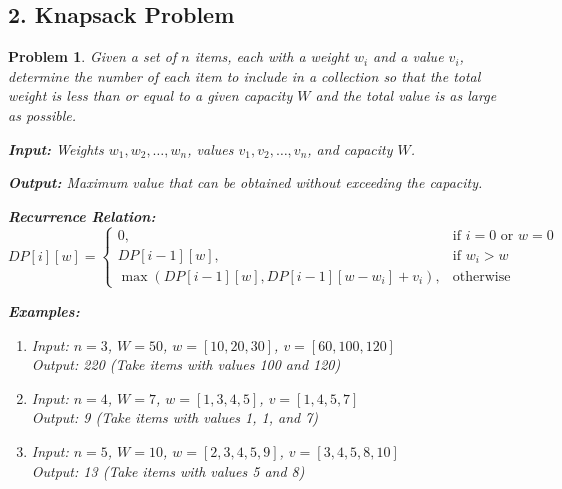 \documentclass{article}
\newtheorem{problem}{Problem}
\begin{document}
\subsection*{2. Knapsack Problem}
\begin{problem}
Given a set of $n$ items, each with a weight $w_i$ and a value $v_i$, determine the number of each item to include in a collection so that the total weight is less than or equal to a given capacity $W$ and the total value is as large as possible.

\textbf{Input:} Weights $w_1, w_2, \ldots, w_n$, values $v_1, v_2, \ldots, v_n$, and capacity $W$.

\textbf{Output:} Maximum value that can be obtained without exceeding the capacity.

\textbf{Recurrence Relation:}
\[
DP[i][w] = 
\begin{cases}
0, & \text{if } i = 0 \text{ or } w = 0 \\
DP[i-1][w], & \text{if } w_i > w \\
\max(DP[i-1][w], DP[i-1][w-w_i] + v_i), & \text{otherwise}
\end{cases}
\]

\textbf{Examples:}
\begin{enumerate}
\item Input: $n = 3$, $W = 50$, $w = [10, 20, 30]$, $v = [60, 100, 120]$ \\
      Output: 220 (Take items with values 100 and 120)
\item Input: $n = 4$, $W = 7$, $w = [1, 3, 4, 5]$, $v = [1, 4, 5, 7]$ \\
      Output: 9 (Take items with values 1, 1, and 7)
\item Input: $n = 5$, $W = 10$, $w = [2, 3, 4, 5, 9]$, $v = [3, 4, 5, 8, 10]$ \\
      Output: 13 (Take items with values 5 and 8)
\end{enumerate}
\end{problem}

\end{document}

